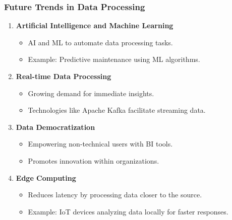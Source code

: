 \documentclass[aspectratio=169]{beamer}
\begin{document}
\begin{frame}[fragile]
    \frametitle{Future Trends in Data Processing}
    \begin{enumerate}
        \item \textbf{Artificial Intelligence and Machine Learning}
            \begin{itemize}
                \item AI and ML to automate data processing tasks.
                \item Example: Predictive maintenance using ML algorithms.
            \end{itemize}

        \item \textbf{Real-time Data Processing}
            \begin{itemize}
                \item Growing demand for immediate insights.
                \item Technologies like Apache Kafka facilitate streaming data.
            \end{itemize}

        \item \textbf{Data Democratization}
            \begin{itemize}
                \item Empowering non-technical users with BI tools.
                \item Promotes innovation within organizations.
            \end{itemize}

        \item \textbf{Edge Computing}
            \begin{itemize}
                \item Reduces latency by processing data closer to the source.
                \item Example: IoT devices analyzing data locally for faster responses.
            \end{itemize}
    \end{enumerate}
\end{frame}
\end{document}
